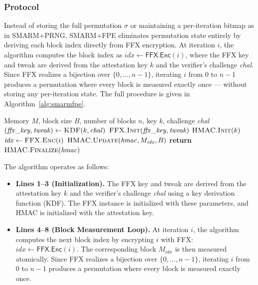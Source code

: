 \documentclass[a4paper,10pt]{article}
\begin{document}
{\subsubsection{Protocol}

Instead of storing the full permutation $\sigma$ or maintaining 
a per-iteration bitmap as in SMARM+PRNG, SMARM+FPE eliminates 
permutation state entirely by deriving each block index directly 
from FFX encryption. At iteration $i$, the algorithm computes 
the block index as $\mathit{idx} \gets \textsf{FFX.Enc}(i)$, 
where the FFX key and tweak are derived from the attestation 
key $k$ and the verifier's challenge \textit{chal}. Since FFX 
realizes a bijection over $\{0, \ldots, n-1\}$, iterating $i$ 
from $0$ to $n-1$ produces a permutation where every block is 
measured exactly once — without storing any per-iteration state. 
The full procedure is given in Algorithm~\ref{alg:smarmfpe}.

\begin{algorithm}
\caption{SMARM+FPE Secure Service}
\label{alg:smarmfpe}
\begin{algorithmic}[1]
\Require Memory $M$, block size $B$, number of blocks $n$, 
         key $k$, challenge \textit{chal}
\State $(\mathit{ffx\_key}, \mathit{tweak}) \gets 
       \Call{KDF}{k, \mathit{chal}}$
\State $\Call{FFX.Init}{\mathit{ffx\_key}, \mathit{tweak}}$
\State $\Call{HMAC.Init}{k}$
    \State $\mathit{idx} \gets \Call{FFX.Enc}{i}$
    \State {}
    \State $\Call{HMAC.Update}{\mathit{hmac}, M_{\mathit{idx}}, B}$
    \State {}
\EndFor
\State \textbf{return} $\Call{HMAC.Finalize}{\mathit{hmac}}$
\end{algorithmic}
\end{algorithm}

The algorithm operates as follows:

\begin{itemize}
    \item \textbf{Lines 1--3 (Initialization).} The FFX key and 
    tweak are derived from the attestation key $k$ and the 
    verifier's challenge \textit{chal} using a key derivation 
    function (KDF). The FFX instance is initialized with these 
    parameters, and HMAC is initialized with the attestation key.
    
    \item \textbf{Lines 4--8 (Block Measurement Loop).} At 
    iteration $i$, the algorithm computes the next block index 
    by encrypting $i$ with FFX: $\mathit{idx} \gets 
    \textsf{FFX.Enc}(i)$. The corresponding block 
    $M_{\mathit{idx}}$ is then measured atomically. Since FFX 
    realizes a bijection over $\{0, \ldots, n-1\}$, iterating 
    $i$ from $0$ to $n-1$ produces a permutation where every 
    block is measured exactly once.
\end{itemize}

}
\end{document}
